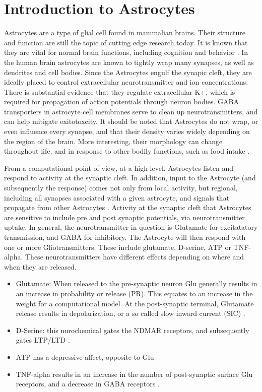     \section{Introduction to Astrocytes}
    Astrocytes are a type of glial cell found in mammalian brains. Their
    structure and function are still the topic of cutting edge research
    today. It is known that they are vital for normal brain functions, including
    cognition and behavior \cite{mederos_2018}. In the human brain astrocytes
    are known to tightly wrap many synapses, as well as dendrites and cell
    bodies. Since the Astrocytes engulf the synapic cleft, they are ideally
    placed to control extracellular neurotransmitter and ion
    concentrations. There is substantial evidence that they regulate
    extracellular K+, which is required for propagation of action potentials
    through neuron bodies. GABA transporters in astrocyte cell membranes serve
    to clean up neurotransmitters, and can help mitigate exitotoxcity. It should
    be noted that Astrocytes do not wrap, or even influence every synapse, and
    that their density varies widely depending on the region of the brain. More
    interesting, their morphology can change throughout life, and in response to
    other bodily functions, such as food intake \cite{mederos_2018}.

    From a computational point of view, at a high level, Astrocytes listen and
    respond to activity at the synaptic cleft. In addition, input to the
    Astrocyte (and subsequently the response) comes not only from local
    activity, but regional, including all synapses associated with a given
    astrocyte, and signals that propagate from other Astrocytes
    \cite{min_2012}. Activity at the synaptic cleft that Astrocytes are
    sensitive to include pre and post synaptic potentials, via neurotransmitter
    uptake. In general, the neurotransmitter in question is Glutamate for
    excitatatory transmission, and GABA for inhibitory. The Astrocyte will then
    respond with one or more Gliotransmitters. These include glutamate,
    D-serine, ATP or TNF-alpha. These neurotransmitters have different effects
    depending on where and when they are released.
    \begin{itemize}
      \item Glutamate: When released to the pre-synaptic neuron Glu generally
        results in an increase in probability or release (PR). This equates to
        an increase in the weight for a computational model. At the
        post-synaptic terminal, Glutamate release results in depolarization, or
        a so called slow inward current (SIC) \cite{pitta_2016}.
      \item D-Serine: this nurochemical gates the NDMAR receptors, and
        subsequently gates LTP/LTD \cite{mederos_2018}.
      \item ATP has a depressive affect, opposite to Glu \cite{mederos_2018}
      \item TNF-alpha results in an increase in the number of post-synaptic
        surface Glu receptors, and a decrease in GABA receptors
        \cite{chung_2015}.
    \end{itemize}

